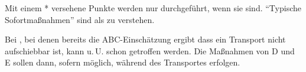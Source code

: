 \begin{tcolorbox}
\begin{minipage}[t]{\linewidth -
{2\fboxrule} - {2\fboxsep}}
\begin{minipage}[t]{\linewidth}
{\begin{center}
{ Mit einem * versehene Punkte werden nur durchgeführt,
wenn sie  sind. \enquote{Typische
Sofortmaßnahmen} sind als  zu verstehen. 

Bei , bei denen bereits die 
ABC-Einschätzung ergibt dass ein Transport nicht aufschiebbar ist, 
kann u.\,U. schon  
getroffen werden. 
Die Maßnahmen von D und E sollen dann, sofern möglich, während des 
Transportes erfolgen. }
\end{center}
}
\end{minipage}
\end{minipage}%
\end{tcolorbox}






\vfill
\restoregeometry\pagestyle{fancy}






    	










